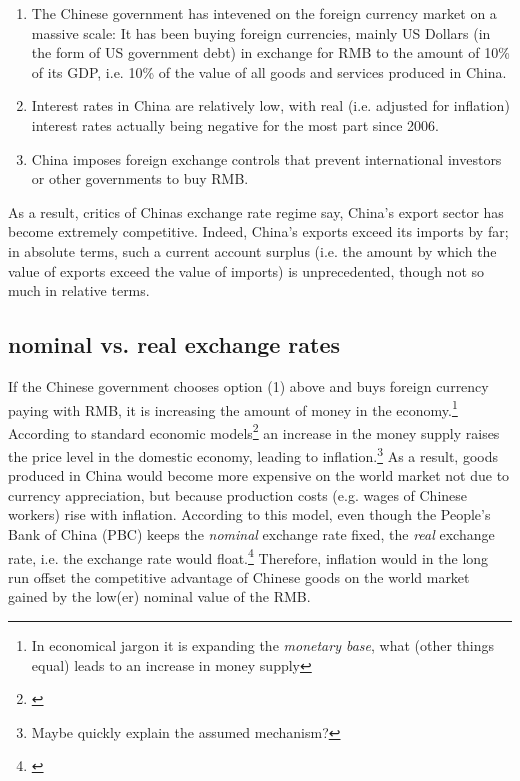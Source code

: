 \documentclass[11pt]{article}
\begin{document}
\begin{enumerate}
\item{The Chinese government has intevened on the foreign currency market on a massive scale: It has been buying foreign currencies, mainly US Dollars (in the form of US government debt) in exchange for RMB to the amount of 10\% of its GDP, i.e. 10\% of the value of all goods and services produced in China.} %
\item{Interest rates in China are relatively low, with real (i.e. adjusted for inflation) interest rates actually being negative for the most part since 2006.} %
\item{China imposes foreign exchange controls that prevent international investors or other governments to buy RMB.}%
\end{enumerate}

As a result, critics of Chinas exchange rate regime say, China's export sector has become extremely competitive. Indeed, China's exports exceed its imports by far; in absolute terms, such a current account surplus (i.e. the amount by which the value of exports exceed the value of imports) is unprecedented, though not so much in relative terms. %

 
\subsection{nominal vs. real exchange rates}

If the Chinese government chooses option (1) above and buys foreign currency paying with RMB, it is increasing the amount of money in the economy.\footnote{In economical jargon it is expanding the \emph{monetary base}, what (other things equal) leads to an increase in money supply} According to standard economic models\footnote{\cite[pp. ?]{Krugman2008}} an increase in the money supply raises the price level in the domestic economy, leading to inflation.\footnote{Maybe quickly explain the assumed mechanism?} As a result, goods produced in China would become more expensive on the world market not due to currency appreciation, but because production costs (e.g. wages of Chinese workers) rise with inflation. According to this model, even though the People's Bank of China (PBC) keeps the \emph{nominal} exchange rate fixed, the \emph{real} exchange rate, i.e. the exchange rate would float.\footnote{\cite[p. 509]{Krugman}} Therefore, inflation would in the long run offset the competitive advantage of Chinese goods on the world market gained by the low(er) nominal value of the RMB.
\end{document}
